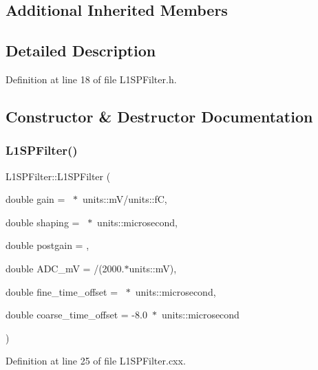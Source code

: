 \subsection*{Additional Inherited Members}


\subsection{Detailed Description}


Definition at line 18 of file L1\+S\+P\+Filter.\+h.



\subsection{Constructor \& Destructor Documentation}
\mbox{\label{class_wire_cell_1_1_sig_proc_1_1_l1_s_p_filter_a7d0f598eb9e9bbb7acbcdbce742ccdb2}} 
\subsubsection{\texorpdfstring{L1\+S\+P\+Filter()}{L1SPFilter()}}
{\footnotesize\ttfamily L1\+S\+P\+Filter\+::\+L1\+S\+P\+Filter (\begin{DoxyParamCaption}\item[{double}]{gain = {~$\ast$~units\+:\+:mV/units\+:\+:fC},  }\item[{double}]{shaping = {~$\ast$~units\+:\+:microsecond},  }\item[{double}]{postgain = {},  }\item[{double}]{A\+D\+C\+\_\+mV = {/(2000.$\ast$units\+:\+:mV)},  }\item[{double}]{fine\+\_\+time\+\_\+offset = {~$\ast$~units\+:\+:microsecond},  }\item[{double}]{coarse\+\_\+time\+\_\+offset = {\ttfamily -\/8.0~$\ast$~units\+:\+:microsecond} }\end{DoxyParamCaption})}



Definition at line 25 of file L1\+S\+P\+Filter.\+cxx.

